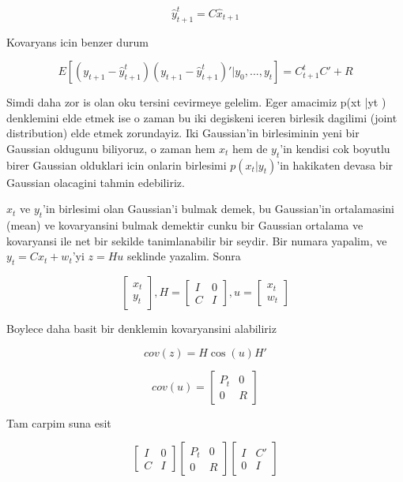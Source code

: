 \documentclass[12pt,fleqn]{article}\usepackage{../common}
\begin{document}
\[ \hat{y}_{t+1}^t = C\hat{x}_{t+1} \]

Kovaryans icin benzer durum

\[ E[(y_{t+1}-\hat{y}_{t+1}^t)(y_{t+1}-\hat{y}_{t+1}^t)' | y_0,...,y_t] = 
C_{t+1}^t C' + R
 \]

 Simdi daha zor is olan oku tersini cevirmeye gelelim. Eger amacimiz p(xt
 |yt ) denklemini elde etmek ise o zaman bu iki degiskeni iceren birlesik
 dagilimi (joint distribution) elde etmek zorundayiz. Iki Gaussian'in
 birlesiminin yeni bir Gaussian oldugunu biliyoruz, o zaman hem $x_t$ hem
 de $y_t$'in kendisi cok boyutlu birer Gaussian olduklari icin onlarin
 birlesimi $p(x_t |y_t )$'in hakikaten devasa bir Gaussian olacagini tahmin
 edebiliriz.

$x_t$ ve $y_t$'in birlesimi olan Gaussian'i bulmak demek, bu Gaussian'in 
ortalamasini (mean) ve kovaryansini bulmak demektir cunku bir Gaussian 
ortalama ve kovaryansi ile net bir sekilde tanimlanabilir bir seydir. 
Bir numara yapalim, ve $y_t = Cx_t + w_t$'yi $z = Hu$ seklinde
yazalim. Sonra 

\[ 
\left[\begin{array}{r}
x_t \\
y_t
\end{array}\right], 
H = 
\left[\begin{array}{rr}
I & 0 \\
C & I
\end{array}\right], 
u = 
\left[\begin{array}{r}
x_t \\
w_t
\end{array}\right]
 \]

Boylece daha basit bir denklemin kovaryansini alabiliriz

\[ cov(z) = H \cos(u) H' \]

\[ 
cov(u) = 
\left[\begin{array}{rr}
P_t & 0 \\
0 & R
\end{array}\right]
 \]

Tam carpim suna esit

\[ 
\left[\begin{array}{rr}
I & 0 \\
C & I
\end{array}\right]
\left[\begin{array}{rr}
P_t & 0 \\
0 & R
\end{array}\right]
\left[\begin{array}{rr}
I & C' \\
0 & I
\end{array}\right]
 \]
\end{document}

